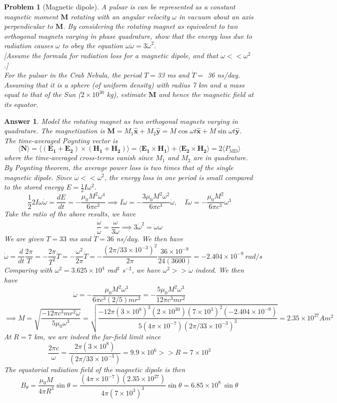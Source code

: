 \documentclass[a4paper]{article}
\newtheorem{ans}{Answer}
\theoremstyle{new}
\newtheorem{qns}{Problem}
\begin{document}
\newpage
\begin{qns}[Magnetic dipole]
A pulsar is can be represented as a constant magnetic moment $\mathbf{M}$ rotating with
an angular velocity $\omega$ in vacuum about an axis perpendicular to $\mathbf{M}$. By considering the rotating magnet as equivalent to two orthogonal magnets varying in phase quadrature, show that the energy loss due to radiation causes $\omega$ to obey the equation $\omega\ddot{\omega}=3\dot{\omega}^2$.\\[5pt]
[Assume the formula for radiation loss for a magnetic dipole, and that $\dot{\omega}<<\omega^2$.]\\[5pt]
For the pulsar in the Crab Nebula, the period $T = $33 ms and $\dot{T}=$ 36 ns/day. Assuming that it is a sphere (of uniform density) with radius 7 km and a mass equal to that of the Sun ($2\times 10^{30}$ kg), estimate $\mathbf{M}$ and hence the magnetic field at its equator.
\end{qns}
\begin{ans}
Model the rotating magnet as two orthogonal magnets varying in quadrature. The magnetization is $\mathbf{M}=M_1\mathbf{\hat{x}}+M_2\mathbf{\hat{y}}=M\cos\omega t\mathbf{\hat{x}}+M\sin\omega t\mathbf{\hat{y}}$. The time-averaged Poynting vector is
$$\langle\mathbf{N}\rangle=\langle(\mathbf{E_1}+\mathbf{E_2})\times(\mathbf{H_1}+\mathbf{H_2})\rangle=\langle\mathbf{E_1}\times\mathbf{H_1}\rangle+\langle\mathbf{E_2}\times\mathbf{H_2}\rangle=2\langle P_{\text{MD}}\rangle$$
where the time-averaged cross-terms vanish since $M_1$ and $M_2$ are in quadrature. By Poynting theorem, the average power loss is two times that of the single magnetic dipole. Since $\dot{\omega}<<\omega^2$, the energy loss in one period is small compared to the stored energy $E=\frac{1}{2}I\omega^2$.
$$\frac{1}{2}2I\omega\dot{\omega}=\frac{dE}{dt}=-\frac{\mu_0M^2\omega^4}{6\pi c^3}\implies I\ddot{\omega}=-\frac{3\mu_0M^2\omega^2}{6\pi c^3}\dot{\omega},\quad I\dot{\omega}=-\frac{\mu_0M^2}{6\pi c^3}\omega^3$$
Take the ratio of the above results, we have
$$\frac{\dot{\omega}}{\ddot{\omega}}=\frac{\omega}{3\dot{\omega}}\implies3\dot{\omega}^2=\ddot{\omega}\omega$$
We are given $T=33$ ms and $\dot{T}=36$ ns/day. We then have
$$\dot{\omega}=\frac{d}{dt}\frac{2\pi}{T}=-\frac{2\pi}{T^2}\dot{T}=-\frac{\omega^2}{2\pi}\dot{T}=-\frac{(2\pi/33\times10^{-3})^2}{2\pi}\frac{36\times10^{-9}}{24(3600)}=-2.404\times10^{-9}~rad/s$$
Comparing with $\omega^2=3.625\times10^4$ rad$^2$ s$^{-2}$, we have $\omega^2>>\dot{\omega}$ indeed. We then have
$$\dot{\omega}=-\frac{\mu_0M^2\omega^3}{6\pi c^3(2/5)mr^2}=-\frac{5\mu_0M^2\omega^3}{12\pi c^3mr^2}$$
$$\implies M=\sqrt{\frac{-12\pi c^3mr^2\dot{\omega}}{5\mu_0\omega^3}}=\sqrt{\frac{-12\pi (3\times10^8)^3(2\times10^{30})(7\times10^3)^2(-2.404\times10^{-9})}{5(4\pi\times10^{-7})(2\pi/33\times10^{-3})^3}}=2.35\times10^{27}Am^2$$
At $R=7$ km, we are indeed the far-field limit since
$$\frac{2\pi c}{\omega}=\frac{2\pi(3\times10^8)}{(2\pi/33\times10^{-3})}=9.9\times10^6>>R=7\times10^3$$
The equatorial radiation field of the magnetic dipole is then
$$B_\theta=\frac{\mu_0M}{4\pi R^3}\sin\theta=\frac{(4\pi\times10^{-7})(2.35\times10^{27})}{4\pi(7\times10^3)^3}\sin\theta=6.85\times10^8~\sin\theta$$
\end{ans}
\end{document}
